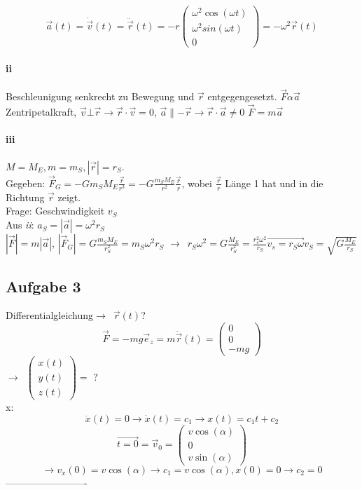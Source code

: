 \documentclass[oneside]{book}
\theoremstyle{definition}
\newcommand{\conseq}{$\rightarrow$~}
\newcommand{\Dgl}{Differentialgleichung}
\newcommand{\dotvec}[1]{\dot{\vec{#1}}}
\newcommand{\ddotvec}[1]{\ddot{\vec{#1}}}
\begin{document}
$$\vec{a}(t) = \dotvec v (t) = \ddotvec r (t) = - r \begin{pmatrix}\omega^2 \cos(\omega t) \\ \omega^2 sin(\omega t) \\ 0 \end{pmatrix} = - \omega^2 \vec{r}(t)$$

\paragraph{ii}
Beschleunigung senkrecht zu Bewegung und $\vec{r}$ entgegengesetzt. $\vec{F} \alpha \vec{a}$ Zentripetalkraft, $\vec{v} \bot \vec{r} \rightarrow \vec{r} \cdot \vec{v} = 0$, $\vec{a} \parallel - \vec{r} \rightarrow \vec{r} \cdot \vec{a} \neq 0$ $\vec{F} = m \vec{a}$

\paragraph{iii}
$M = M_E, m = m_S, |\vec{r}| = r_S$.\\
Gegeben: $\vec{F}_G = - G m_S M_E \frac{\vec{r}}{r^3} = - G \frac{m_S M_E}{r^2} \frac{\vec{r}}{r}$, wobei $\frac{\vec{r}}{r}$ Länge 1 hat und in die Richtung $\vec{r}$ zeigt.\\
Frage: Geschwindigkeit $v_S$\\
Aus \textit{ii}: $a_S = | \vec{a}| = \omega^2 r_S$\\
$|\vec{F}| = m |\vec{a}|$, $|\vec{F}_G| = G \frac{m_S M_E}{r_S^2} = m_S \omega^2 r_S$ \conseq $r_S \omega^2 = G \frac{M_E}{r_S^2} = \frac{r_s^2 \omega^2}{r_S} \overrightarrow{v_s = r_S \omega} v_S = \sqrt{G \frac{M_E}{r_S}}$

\subsection{Aufgabe 3}
\Dgl \conseq $\vec{r}(t)$?
$$\vec{F} = - m g \vec{e}_z = m \ddotvec{r} (t) = \begin{pmatrix}0\\ 0\\ - mg \end{pmatrix}$$
\conseq $\begin{pmatrix}x(t) \\ y(t) \\ z(t)\end{pmatrix} = $ ?\\
x: 
$$\ddot{x}(t) = 0 \rightarrow \dot{x}(t) = c_1 \rightarrow x(t) = c_1 t + c_2$$
$$\vec{t = 0} = \vec{v}_0 = \begin{pmatrix}v \cos(\alpha) \\ 0 \\ v \sin(\alpha)\end{pmatrix}$$
$$\rightarrow v_x(0) = v \cos(\alpha) \rightarrow c_1 = v \cos(\alpha), x(0) = 0 \rightarrow c_2 = 0$$
-------------------------
\end{document}
